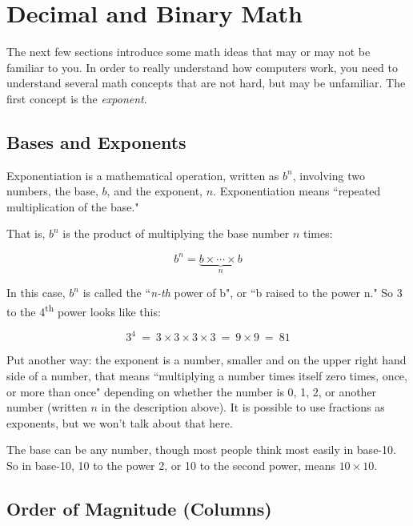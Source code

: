 \section{Decimal and Binary Math}

The next few sections introduce some math ideas that may or may not be familiar to you. In order to really understand how computers work, you need to understand several math concepts that are not hard, but may be unfamiliar. The first concept is the \emph{exponent}. 

\subsection*{Bases and Exponents}

Exponentiation is a mathematical operation, written as $b^n$, involving two numbers, the base, $b$, and the exponent, $n$. Exponentiation means ``repeated multiplication of the base." 

\noindent That is, $b^n$ is the product of multiplying the base number $n$ times:


\begin{equation*}
b^{n}=\underbrace {b\times \cdots \times b} _{n}
\end{equation*}

\noindent In this case, $b^n$ is called the ``\emph{n-th} power of b", or ``b raised to the power n." So 3 to the 4\textsuperscript{th} power looks like this: 

\begin{equation*}
3^4 ~=~ 3 \times 3 \times 3 \times 3 ~=~ 9 \times 9 ~=~  81
\end{equation*}



Put another way: the exponent is a number, smaller and on the upper right hand side of a number, that means ``multiplying a number times itself zero times, once, or more than once" depending on whether the number is 0, 1, 2, or another number (written $n$ in the description above). It is possible to use fractions as exponents, but we won't talk about that here.

The base can be any number, though most people think most easily in base-10. So in base-10, 10 to the power 2, or 10 to the second power, means $10 \times 10$. 

\subsection*{Order of Magnitude (Columns)}

